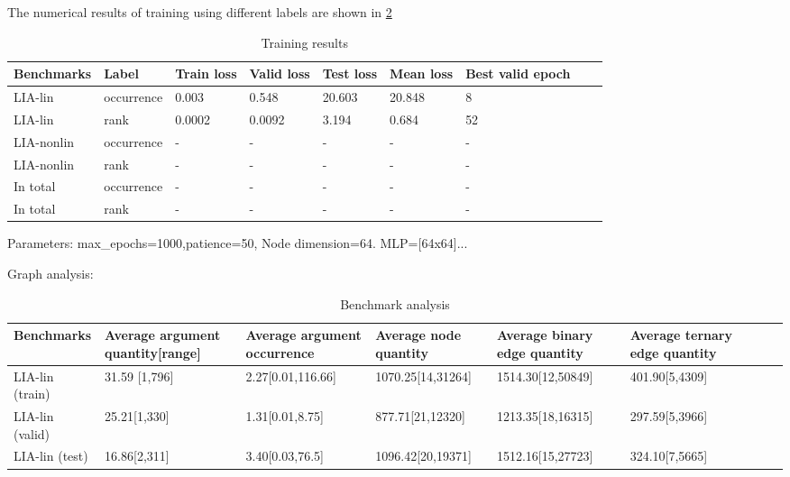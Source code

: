\documentclass{article}
\begin{document}
The numerical results of training using different labels are shown in \ref{training-results}
\begin{table}[h]\caption{Training results}\label{training-results}
\begin{center}
\begin{tabular}{lp{1.5cm}p{1.5cm}p{1.5cm}p{1.5cm}p{1.5cm}p{1.5cm}p{1.5cm}p{1.5cm}}
\hline
Benchmarks  & Label & Train loss & Valid loss & Test loss & Mean loss & Best valid epoch  \\
\hline
LIA-lin       & occurrence & 0.003 & 0.548 & 20.603 & 20.848 & 8 \\
LIA-lin       & rank & 0.0002 & 0.0092 & 3.194 & 0.684 & 52 \\
LIA-nonlin    & occurrence & - & - & - & - & - \\
LIA-nonlin    & rank & - & - & - & - & - \\
In total      & occurrence & - & - & - & - & - \\
In total      & rank & - & - & - & - & - \\
\hline
\end{tabular}
\end{center}
\end{table}

Parameters: max\_epochs=1000,patience=50, Node dimension=64. MLP=[64x64]...




Graph analysis:

\begin{table}[h]\caption{Benchmark analysis}\label{training-results}
\begin{center}
\begin{tabular}{lp{2cm}p{2.5cm}p{2.5cm}p{2.5cm}p{2.5cm}p{1.5cm}p{1.5cm}p{1.5cm}}
\hline
Benchmarks  & Average argument quantity[range] & Average argument occurrence & Average node quantity & Average binary edge quantity & Average ternary edge quantity  \\
\hline
LIA-lin (train)     & 31.59 [1,796] & 2.27[0.01,116.66] & 1070.25[14,31264] & 1514.30[12,50849] & 401.90[5,4309]\\
LIA-lin (valid)     & 25.21[1,330] & 1.31[0.01,8.75] & 877.71[21,12320] & 1213.35[18,16315] & 297.59[5,3966]  \\
LIA-lin (test)     & 16.86[2,311] & 3.40[0.03,76.5] & 1096.42[20,19371] & 1512.16[15,27723] & 324.10[7,5665]  \\
\hline
\end{tabular}
\end{center}
\end{table}
\end{document}
